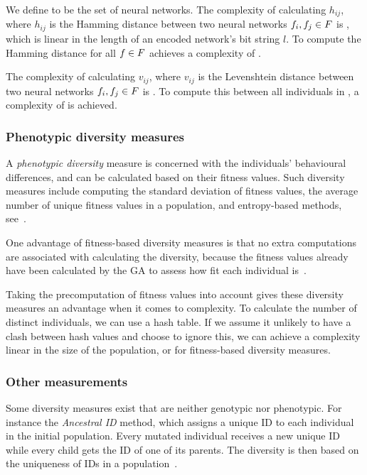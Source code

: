 We define \indset{} to be the set of neural networks. The complexity of calculating $h_{ij}$, where $h_{ij}$ is the Hamming distance between two neural networks $f_i, f_j \in F$ is \bigO{\bitstringl}, which is linear in the length of an encoded network's bit string $l$. To compute the Hamming distance for all $f \in F$ achieves a complexity of \bigO{\indsetl^2 \cdot \bitstringl}. 

The complexity of calculating $v_{ij}$, where $v_{ij}$ is the Levenshtein distance between two neural networks $f_i, f_j \in F$ is . To compute this between all individuals in \indset{}, a complexity of  is achieved.

\subsubsection{Phenotypic diversity measures}
A \emph{phenotypic diversity} measure is concerned with the individuals' behavioural differences, and can be calculated based on their fitness values. Such diversity measures include computing the standard deviation of fitness values, the average number of unique fitness values in a population, and entropy-based methods, see~\cite{1250187, 1266373}.

One advantage of fitness-based diversity measures is that no extra computations are associated with calculating the diversity, because the fitness values already have been calculated by the GA to assess how fit each individual is~\cite{Nguyen:2006:ASPGP}.

Taking the precomputation of fitness values into account gives these diversity measures an advantage when it comes to complexity. To calculate the number of distinct individuals, we can use a hash table. If we assume it unlikely to have a clash between hash values and choose to ignore this, we can achieve a complexity linear in the size of the population, or \bigO{\indsetl} for fitness-based diversity measures.

\subsubsection{Other measurements}
Some diversity measures exist that are neither genotypic nor phenotypic. For instance the \emph{Ancestral ID} method, which assigns a unique ID to each individual in the initial population. Every mutated individual receives a new unique ID while every child gets the ID of one of its parents. The diversity is then based on the uniqueness of IDs in a population~\cite{1250187}.
